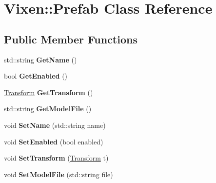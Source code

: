 \hypertarget{class_vixen_1_1_prefab}{}\section{Vixen\+:\+:Prefab Class Reference}
\label{class_vixen_1_1_prefab}
\subsection*{Public Member Functions}
\begin{DoxyCompactItemize}
\item 
\hypertarget{class_vixen_1_1_prefab_a90091098241199fe5d6d24b485d0c920}{}std\+::string {\bfseries Get\+Name} ()\label{class_vixen_1_1_prefab_a90091098241199fe5d6d24b485d0c920}

\item 
\hypertarget{class_vixen_1_1_prefab_a8ec20c52af75acc8eac83e4cc48effa4}{}bool {\bfseries Get\+Enabled} ()\label{class_vixen_1_1_prefab_a8ec20c52af75acc8eac83e4cc48effa4}

\item 
\hypertarget{class_vixen_1_1_prefab_aa5a466009251ad432d8cc7d9a43f05bd}{}\hyperlink{class_vixen_1_1_transform}{Transform} {\bfseries Get\+Transform} ()\label{class_vixen_1_1_prefab_aa5a466009251ad432d8cc7d9a43f05bd}

\item 
\hypertarget{class_vixen_1_1_prefab_ae5dc4ca4ab3d35542164dda4b0e191b0}{}std\+::string {\bfseries Get\+Model\+File} ()\label{class_vixen_1_1_prefab_ae5dc4ca4ab3d35542164dda4b0e191b0}

\item 
\hypertarget{class_vixen_1_1_prefab_a5fef6bd5c597b076fbbc40c363b38c78}{}void {\bfseries Set\+Name} (std\+::string name)\label{class_vixen_1_1_prefab_a5fef6bd5c597b076fbbc40c363b38c78}

\item 
\hypertarget{class_vixen_1_1_prefab_a3986e5c99f7b0063a9757234c9eb4b1e}{}void {\bfseries Set\+Enabled} (bool enabled)\label{class_vixen_1_1_prefab_a3986e5c99f7b0063a9757234c9eb4b1e}

\item 
\hypertarget{class_vixen_1_1_prefab_a88f4ca2ba11ac24f37e8e237d549996c}{}void {\bfseries Set\+Transform} (\hyperlink{class_vixen_1_1_transform}{Transform} t)\label{class_vixen_1_1_prefab_a88f4ca2ba11ac24f37e8e237d549996c}

\item 
\hypertarget{class_vixen_1_1_prefab_a7344d1747731899720bb91f3a9fca9ff}{}void {\bfseries Set\+Model\+File} (std\+::string file)\label{class_vixen_1_1_prefab_a7344d1747731899720bb91f3a9fca9ff}


\end{DoxyCompactItemize}
